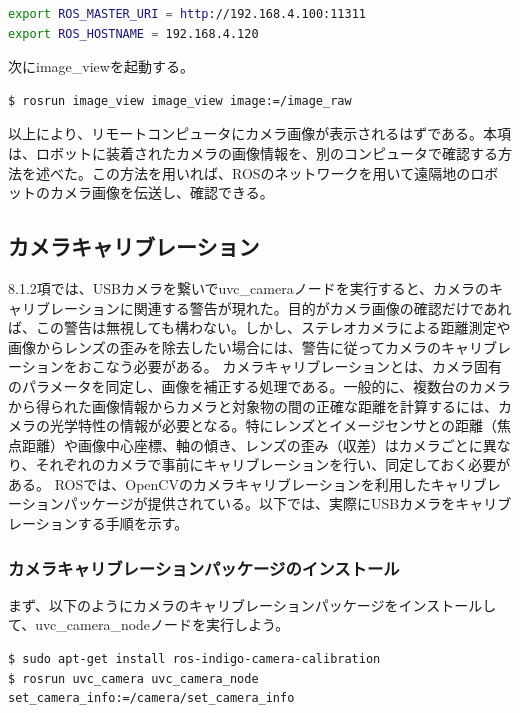 \begin{lstlisting}[language=bash]
export ROS_MASTER_URI = http://192.168.4.100:11311
export ROS_HOSTNAME = 192.168.4.120
\end{lstlisting}

次にimage\_viewを起動する。

\begin{lstlisting}[language=ROS]
$ rosrun image_view image_view image:=/image_raw
\end{lstlisting}

以上により、リモートコンピュータにカメラ画像が表示されるはずである。本項は、ロボットに装着されたカメラの画像情報を、別のコンピュータで確認する方法を述べた。この方法を用いれば、ROSのネットワークを用いて遠隔地のロボットのカメラ画像を伝送し、確認できる。

\subsection{カメラキャリブレーション}

8.1.2項では、USBカメラを繋いでuvc\_cameraノードを実行すると、カメラのキャリブレーションに関連する警告が現れた。目的がカメラ画像の確認だけであれば、この警告は無視しても構わない。しかし、ステレオカメラによる距離測定や画像からレンズの歪みを除去したい場合には、警告に従ってカメラのキャリブレーションをおこなう必要がある。
カメラキャリブレーションとは、カメラ固有のパラメータを同定し、画像を補正する処理である。一般的に、複数台のカメラから得られた画像情報からカメラと対象物の間の正確な距離を計算するには、カメラの光学特性の情報が必要となる。特にレンズとイメージセンサとの距離（焦点距離）や画像中心座標、軸の傾き、レンズの歪み（収差）はカメラごとに異なり、それぞれのカメラで事前にキャリブレーションを行い、同定しておく必要がある。
ROSでは、OpenCVのカメラキャリブレーションを利用したキャリブレーションパッケージが提供されている。以下では、実際にUSBカメラをキャリブレーションする手順を示す。

\subsubsection{カメラキャリブレーションパッケージのインストール}

まず、以下のようにカメラのキャリブレーションパッケージをインストールして、uvc\_camera\_nodeノードを実行しよう。

\begin{lstlisting}[language=ROS]
$ sudo apt-get install ros-indigo-camera-calibration
$ rosrun uvc_camera uvc_camera_node set_camera_info:=/camera/set_camera_info
\end{lstlisting}

